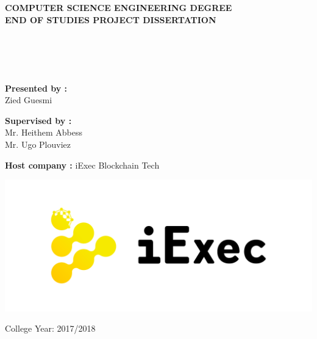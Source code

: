 \documentclass[a4paper,12pt,times,numbered,print,index]{report}
\begin{document}
    \begin{center}
        \bf \large {COMPUTER SCIENCE ENGINEERING DEGREE} \\
        \bf \large {END OF STUDIES PROJECT DISSERTATION} \\
    \end{center}
    ~~
    \\
    ~~
    \\
    \\
    \\
    { \hspace*{2 cm} \bf Presented by :} \\  
    {\hspace*{6 cm}    Zied Guesmi \\}

    {\hspace*{1.18 cm} \bf Supervised by :}  \\    
    { \hspace*{6 cm}  Mr. Heithem Abbess \\}
    { \hspace*{6 cm}  Mr. Ugo Plouviez \\}

    {\hspace*{1.1 cm} \bf Host company :} 
    { \hspace*{0.5 cm}  iExec Blockchain Tech \\}

    \begin{center}
        \includegraphics[scale=0.2]{figs/iExec.pdf}
    \end{center}

    \begin{center}
        College Year: 2017/2018
    \end{center}
\end{document}
